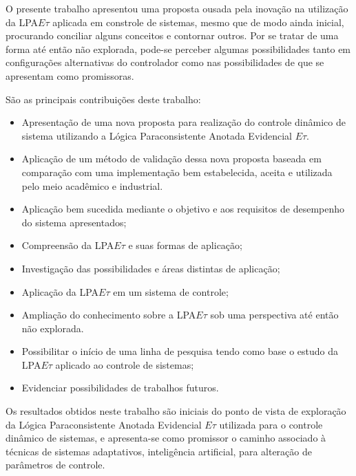 O presente trabalho apresentou uma proposta ousada pela inovação na
utilização da LPA$E\tau$ aplicada em constrole de sistemas,
mesmo que de modo ainda inicial,
procurando conciliar alguns conceitos e contornar outros.
Por se tratar de uma forma até então não explorada,
pode-se perceber algumas possibilidades
tanto em configurações alternativas do controlador como nas
possibilidades de que se apresentam como promissoras.


São as principais contribuições deste trabalho:

\begin{itemize}

\item Apresentação de uma nova proposta para realização do controle dinâmico de sistema utilizando a Lógica Paraconsistente Anotada Evidencial $E\tau$.

\item Aplicação de um método de validação dessa nova proposta baseada em comparação com uma implementação bem estabelecida, aceita e utilizada pelo meio acadêmico e industrial.

\item Aplicação bem sucedida mediante o objetivo e aos requisitos de desempenho do sistema apresentados;

\item Compreensão da LPA$E\tau$ e suas formas de aplicação;

\item Investigação das possibilidades e áreas distintas de aplicação;

\item Aplicação da LPA$E\tau$ em um sistema de controle;

\item Ampliação do conhecimento sobre a LPA$E\tau$ sob uma perspectiva até então não explorada.

\item Possibilitar o início de uma linha de pesquisa tendo como base o estudo da LPA$E\tau$ aplicado ao controle de sistemas;

\item Evidenciar possibilidades de trabalhos futuros.

\end{itemize}


Os resultados obtidos neste trabalho são iniciais do ponto de vista de exploração da Lógica Paraconsistente Anotada Evidencial $E\tau$ utilizada para o controle dinâmico de sistemas, e apresenta-se como promissor o caminho associado à técnicas de sistemas adaptativos, inteligência artificial, para alteração de parâmetros de controle.


